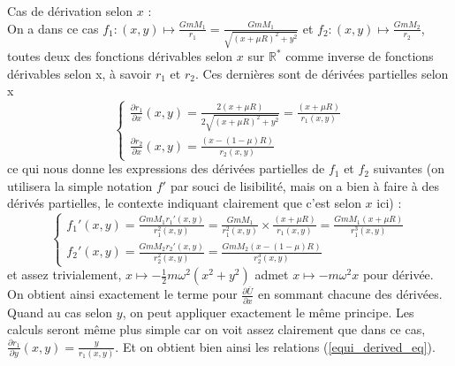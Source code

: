 \documentclass[12pt]{article}
\theoremstyle{definition}
\theoremstyle{definition}
\begin{document}
	Cas de dérivation selon $x$ : \\
	On a dans ce cas $f_1 : (x,y) \longmapsto \frac{GmM_1}{r_1} = \frac{GmM_1}{\sqrt{(x+\mu R)^2 + y^2}}$ et $f_2 : (x,y) \longmapsto \frac{GmM_2}{r_2}$, toutes deux des fonctions dérivables selon $x$ sur $\mathbb{R}^*$ comme inverse de fonctions dérivables selon x, à savoir $r_1$ et $r_2$. Ces dernières sont de dérivées partielles selon x
	\begin{equation*}
		\begin{cases}
			\frac{\partial r_1}{\partial x}(x,y) = \frac{2(x+\mu R)}{2\sqrt{(x+\mu R)^2 + y^2}} = \frac{(x+\mu R)}{r_1(x,y)}
			\\
			\frac{\partial r_2}{\partial x}(x,y) = \frac{(x-(1-\mu)R)}{r_2(x,y)}
		\end{cases}
	\end{equation*}
	ce qui nous donne les expressions des dérivées partielles de $f_1$ et $f_2$ suivantes (on utilisera la simple notation $f'$ par souci de lisibilité, mais on a bien à faire à des dérivés partielles, le contexte indiquant clairement que c'est selon $x$ ici) :
	\begin{equation*}
		\begin{cases}
			f_1'(x,y) = \frac{GmM_1 r_1'(x,y)}{r_1^2(x,y)} = \frac{GmM_1}{r_1^2(x,y)} \times \frac{(x+\mu R)}{r_1(x,y)} = \frac{GmM_1(x+\mu R)}{r_1^3(x,y)}
			\\
			f_2'(x,y) = \frac{GmM_2 r_2'(x,y)}{r_2^2(x,y)} = \frac{GmM_2(x-(1-\mu)R)}{r_2^3(x,y)}
		\end{cases}
	\end{equation*}
	et assez trivialement, $x \longmapsto -\frac{1}{2}m\omega^2(x^2+y^2)$ admet $x \longmapsto -m\omega^2x$ pour dérivée. On obtient ainsi exactement le terme pour $\frac{\partial \bar{U}}{\partial x}$ en sommant chacune des dérivées.
	Quand au cas selon $y$, on peut appliquer exactement le même principe. Les calculs seront même plus simple car on voit assez clairement que dans ce cas, $\frac{\partial r_1}{\partial y}(x,y) = \frac{y}{r_1(x,y)}$.
	Et on obtient bien ainsi les relations (\ref{equi_derived_eq}).
	\\
	
\end{document}
